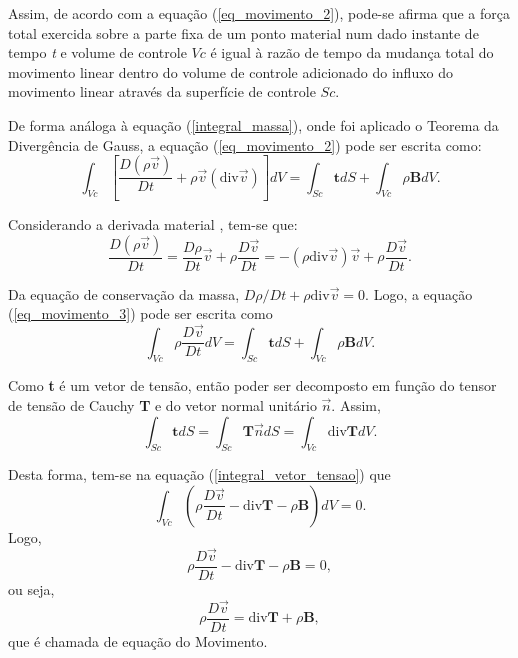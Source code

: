 Assim, de acordo com a equação (\ref{eq_movimento_2}), pode-se afirma que a força total exercida sobre a parte fixa de um ponto material num dado instante de tempo \textit{t} e volume de controle $Vc$ é igual à razão de tempo da mudança total do movimento linear dentro do volume de controle adicionado do influxo do movimento linear através da superfície de controle $Sc$. 

De forma análoga à equação (\ref{integral_massa}), onde foi aplicado o Teorema da Divergência de Gauss, a equação (\ref{eq_movimento_2}) pode ser escrita como:
\begin{equation} \label{eq_movimento_3}
\int_{Vc} \left[ \dfrac{D( \rho \vec{v} )}{Dt} + \rho \vec{v} (\mbox{div} \vec{v}) \right] dV = \int_{Sc} \textbf{t} dS + \int_{Vc} \rho \textbf{B} dV.
\end{equation}

Considerando a derivada material \cite{Malvern}, tem-se que:
\begin{equation}
\dfrac{D( \rho \vec{v} )}{Dt} = \dfrac{D \rho}{Dt} \vec{v} + \rho \dfrac{D \vec{v}}{Dt}= -( \rho \mbox{div} \vec{v}) \vec{v} + \rho \dfrac{D \vec{v}}{Dt}.
\end{equation}  

Da equação de conservação da massa, $D \rho / Dt +  \rho \mbox{div} \vec{v} = 0$. Logo, a equação (\ref{eq_movimento_3}) pode ser escrita como
\begin{equation}
\int_{Vc} \rho \dfrac{D \vec{v}}{Dt} dV = \int_{Sc} \textbf{t} dS + \int_{Vc} \rho \textbf{B} dV.
\end{equation}

Como \textbf{t} é um vetor de tensão, então poder ser decomposto em função do tensor de tensão de Cauchy \textbf{T} e do vetor normal unitário $ \vec{n}$. Assim,
\begin{equation} \label{integral_vetor_tensao}
\int_{Sc} \textbf{t} dS = \int_{Sc} \textbf{T} \vec{n} dS = \int_{Vc} \mbox{div} \textbf{T} dV.
\end{equation}

Desta forma, tem-se na equação (\ref{integral_vetor_tensao}) que
\begin{equation}
\int_{Vc} \left( \rho \dfrac{D \vec{v}}{Dt} - \mbox{div} \textbf{T} - \rho \textbf{B} \right) dV = 0. 
\end{equation}
Logo,
\begin{equation}
\rho \dfrac{D \vec{v}}{Dt} - \mbox{div} \textbf{T} - \rho \textbf{B} = 0,
\end{equation}
ou seja,
\begin{equation} \label{eq_movimento_final}
\rho \dfrac{D \vec{v}}{Dt} = \mbox{div} \textbf{T} + \rho \textbf{B},
\end{equation}
que é chamada de equação do Movimento.

